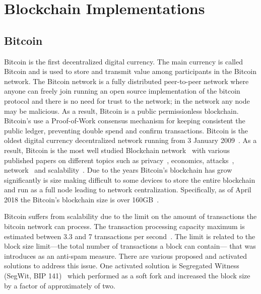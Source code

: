 \section{Blockchain Implementations}\label{blockchain_implementations}

\subsection{Bitcoin}\label{blockchain:impl:bitcoin}

Bitcoin is the first decentralized digital currency. The main currency is called Bitcoin and is used to store and transmit value among participants in the Bitcoin network. The Bitcoin network is a fully distributed peer-to-peer network where anyone can freely join running an open source implementation of the bitcoin protocol and there is no need for trust to the network; in the network any node may be malicious. As a result, Bitcoin is a public permissionless blockchain. Bitcoin's use a Proof-of-Work consensus mechanism for keeping consistent the public ledger, preventing double spend and confirm transactions. Bitcoin is the oldest digital currency decentralized network running from 3 January 2009~\cite{wiki:bitcoin, btc_first_block}. As a result, Bitcoin is the most well studied Blockchain network~\cite{10.1007/978-3-662-46803-6_10} with various published papers on different topics such as privacy~\cite{10.1007/978-3-319-70278-0_8, 10.1007/978-3-642-39884-1_2, Bonneau14e.w.:mixcoin, 10.1007/978-3-662-44774-1_9}, economics\cite{Babaioff:2012:BRB:2229012.2229022, 10.1007/978-3-319-70278-0_17, Bentov2017DecentralizedPM, Carlsten:2016:IBW:2976749.2978408}, attacks~\cite{DBLP:journals_corr_Bahack13, DBLP:journals_corr_EyalS13}, network~\cite{10.1007/978-3-662-44774-1_7, 190890} and scalability~\cite{kiayias2017non, 10.1007/978-3-662-53357-4_5, 10.1007/978-3-662-53357-4_8}. Due to the years Bitcoin's blockchain has grow significantly is size making difficult to some devices to store the entire blockchain and run as a full node leading to network centralization. Specifically, as of April 2018 the Bitcoin's blockchain size is over 160GB~\cite{btc_bl_size}.

Bitcoin suffers from scalability due to the limit on the amount of transactions the bitcoin network can process. The transaction processing capacity maximum is estimated between 3.3 and 7 transactions per second~\cite{10.1007/978-3-662-53357-4_8}. The limit is related to the block size limit---the total number of transactions a block can contain--- that was introduces as an anti-spam measure. There are various proposed and activated solutions to address this issue. One activated solution is Segregated Witness (SegWit, BIP 141)~\cite{wiki:segwit} which performed as a soft fork and increased the block size by a factor of approximately of two.

